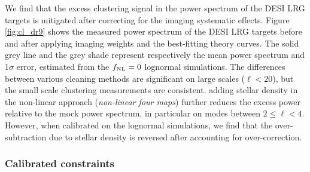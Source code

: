 We find that the excess clustering signal in the power spectrum of the DESI LRG targets is mitigated after correcting for the imaging systematic effects. Figure \ref{fig:cl_dr9} shows the measured power spectrum of the DESI LRG targets before and after applying imaging weights and the best-fitting theory curves. The solid grey line and the grey shade represent respectively the mean power spectrum and 1$\sigma$ error, estimated from the $f_{\rm NL}=0$ lognormal simulations. The differences between various cleaning methods are significant on large scales ($\ell < 20$), but the small scale clustering measurements are consistent.    adding stellar density in the non-linear approach (\textit{non-linear four maps}) further reduces the excess power relative to the mock power spectrum, in particular on modes between $2\leq \ell < 4$. However, when calibrated on the lognormal simulations, we find that the over-subtraction due to stellar density is reversed after accounting for over-correction.


\subsubsection{Calibrated constraints}

